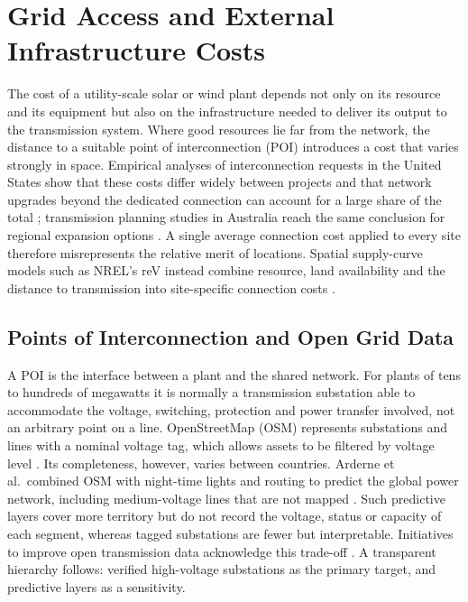 
\section{Grid Access and External Infrastructure Costs}
\label{sec:grid_access_review}

The cost of a utility-scale solar or wind plant depends not only on its
resource and its equipment but also on the infrastructure needed to
deliver its output to the transmission system. Where good resources lie
far from the network, the distance to a suitable point of
interconnection (POI) introduces a cost that varies strongly in space.
Empirical analyses of interconnection requests in the United States show
that these costs differ widely between projects and that network
upgrades beyond the dedicated connection can account for a large share
of the total \cite{seel2023,miso2024}; transmission planning studies in
Australia reach the same conclusion for regional expansion options
\cite{aemo2023}. A single average connection cost applied to every site
therefore misrepresents the relative merit of locations. Spatial
supply-curve models such as NREL's reV instead combine resource, land
availability and the distance to transmission into site-specific
connection costs \cite{maclaurin2021}.

\subsection{Points of Interconnection and Open Grid Data}
\label{subsec:poi_review}

A POI is the interface between a plant and the shared network. For
plants of tens to hundreds of megawatts it is normally a transmission
substation able to accommodate the voltage, switching, protection and
power transfer involved, not an arbitrary point on a line. OpenStreetMap
(OSM) represents substations and lines with a nominal voltage tag, which
allows assets to be filtered by voltage level
\cite{osmPowerTag,osmVoltageTag}. Its completeness, however, varies
between countries. Arderne et al.\ combined OSM with night-time lights
and routing to predict the global power network, including medium-voltage
lines that are not mapped \cite{arderne2020}. Such predictive layers cover
more territory but do not record the voltage, status or capacity of each
segment, whereas tagged substations are fewer but interpretable.
Initiatives to improve open transmission data acknowledge this trade-off
\cite{oetMapYourGrid2025}. A transparent hierarchy follows: verified
high-voltage substations as the primary target, and predictive layers as
a sensitivity.

